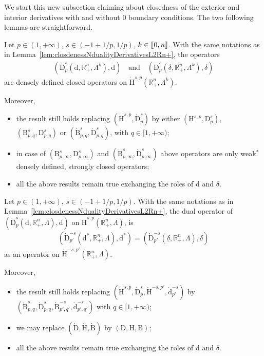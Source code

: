 \documentclass[AHL,Unicode,longabstracts,published]{cedram}
\newcommand{\bbR}{\mathbb{R}}
\newcommand{\rmH}{\mathrm{H}}%
\newcommand{\rmB}{\mathrm{B}}
\newcommand{\rmd}{\mathrm{d}}
\newcommand{\rmD}{\mathrm{D}}
\newcommand{\llbracket}{\mathopen{[\mkern -2.7mu[}}
\newcommand{\rrbracket}{\mathclose{]\mkern -2.7mu]}}
\newcommand{\llb}{\llbracket}
\newcommand{\rrb}{\rrbracket}
\begin{document}
We start this new subsection claiming about closedness of the exterior and interior derivatives with and without $0$ boundary conditions. The two following lemmas are straightforward.

\begin{lemm}
Let $p\in(1,+\infty)$, $s\in(-1+1/p,1/p)$, $k\in\llb 0,n \rrb$. With the same notations as in Lemma~\ref{lem:closdenessNdualityDerivativesL2Rn+}, the operators
\begin{align*}
\left(\dot{\rmD}^{s}_{p}\left(\rmd,\bbR^n_+,\Lambda^k\right),\rmd\right)\quad \text{and}\quad \left(\dot{\rmD}^{s}_{p}\left(\underline{\delta},\bbR^n_+,\Lambda^k\right),{\delta}\right)
\end{align*}
are densely defined closed operators on $\dot{\rmH}^{s,p}(\bbR^n_+,\Lambda^k)$.

Moreover,
\begin{itemize}
\item the result still holds replacing $(\dot{\rmH}^{s,p},\dot{\rmD}^{s}_{p})$ by either $({\rmH}^{s,p},{\rmD}^{s}_{p})$, $(\rmB^{s}_{p,q},\rmD^{s}_{p,q})$ or $(\dot{\rmB}^{s}_{p,q},\dot{\rmD}^{s}_{p,q})$, with $q\in[1,+\infty)$;

\item in case of $(\rmB^{s}_{p,\infty},\rmD^{s}_{p,\infty})$ and $(\dot{\rmB}^{s}_{p,\infty},\dot{\rmD}^{s}_{p,\infty})$ above operators are only weak${}^\ast$ densely defined, strongly closed operators;

\item all the above results remain true exchanging the roles of $\rmd$ and $\delta$.
\end{itemize}
\end{lemm}


\begin{lemm}
Let $p\in(1,+\infty)$, $s\in(-1+1/p,1/p)$. With the same notations as in Lemma~\ref{lem:closdenessNdualityDerivativesL2Rn+}, the dual operator of $(\dot{\rmD}^{s}_{p}(\rmd,\bbR^n_+,\Lambda),\rmd)$ on $\dot{\rmH}^{s,p}(\bbR^n_+,\Lambda)$, is
\begin{align*}
\left(\dot{\rmD}^{-s}_{p'}\left({\rmd}^\ast,\bbR^n_+,\Lambda\right),{\rmd}^\ast\right) = \left(\dot{\rmD}^{-s}_{p'}\left(\underline{\delta},\bbR^n_+,\Lambda\right),{\delta}\right)
\end{align*}
as an operator on $\dot{\rmH}^{-s,p'}(\bbR^n_+,\Lambda)$.

Moreover,
\begin{itemize}
\item the result still holds replacing $(\dot{\rmH}^{s,p},\dot{\rmD}^{s}_{p},\dot{\rmH}^{-s,p'},\dot{\rmd}^{-s}_{p'})$ by $(\dot{\rmB}^{s}_{p,q},\dot{\rmD}^{s}_{p,q},\dot{\rmB}^{-s}_{p',q'},\dot{\rmd}^{-s}_{p',q'})$ with $q\in[1,+\infty)$;

\item we may replace $(\dot{\rmD},\dot{\rmH},\dot{\rmB})$ by $(\rmD,\rmH,\rmB)$;

\item all the above results remain true exchanging the roles of $\rmd$ and $\delta$.
\end{itemize}
\end{lemm}
\end{document}
